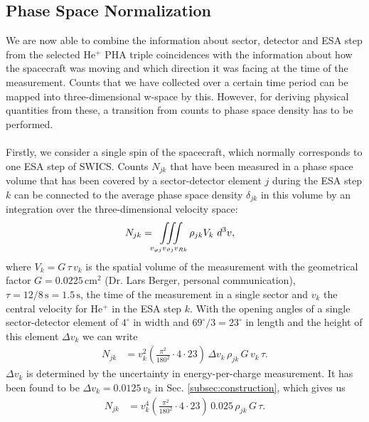 \subsection{Phase Space Normalization}
We are now able to combine the information about sector, detector and ESA step from the selected $\mathrm{He^{+}}$ PHA triple coincidences with the information about how the spacecraft was moving and which direction it was facing at the time of the measurement.
Counts that we have collected over a certain time period can be mapped into three-dimensional w-space by this. However, for deriving physical quantities from these, a transition from counts to phase space density has to be performed.\\ \\
Firstly, we consider a single spin of the spacecraft, which normally corresponds to one ESA step of SWICS.
Counts $N_{jk}$ that have been measured in a phase space volume that has been covered by a sector-detector element $j$ during the ESA step $k$ can be connected to the average phase space density $\delta_{jk}$ in this volume by an integration over the three-dimensional velocity space:
\begin{align*}
N_{jk} &= \iiint\displaylimits_{v_{\varphi j}v_{\vartheta j}v_{R k}} \rho_{jk}	V_k	\,\,	d^3v,
\end{align*}
where $V_k = G \, \tau \, v_k$ is the spatial volume of the measurement with the geometrical factor $G = 0.0225 \,\mathrm{cm^2}$ (Dr. Lars Berger, personal communication), $\tau = 12/8\,\mathrm{s} = 1.5\,\mathrm{s}$, the time of the measurement in a single sector and $v_k$ the central velocity for $\mathrm{He^{+}}$ in the ESA step $k$.
With the opening angles of a single sector-detector element of $4^\circ$ in width and $69^\circ /3 = 23^\circ$ in length and the height of this element $\Delta v_k$ we can write
\begin{align*}
N_{jk} &= v^2_k \left(\frac{\pi^2}{180^2}\cdot4 \cdot 23\right) \, \Delta v_k \, \rho_{jk} \,	G \, v_k \, \tau.
\end{align*}
$\Delta v_k$ is determined by the uncertainty in energy-per-charge measurement. It has been found to be $\Delta v_k = 0.0125 \, v_k$ in Sec. \ref{subsec:construction}, which gives us
\begin{align*}
N_{jk} &= v^4_k \left(\frac{\pi^2}{180^2}\cdot4 \cdot 23\right) \, 0.025\, \rho_{jk} \, G  \, \tau.
\end{align*}
